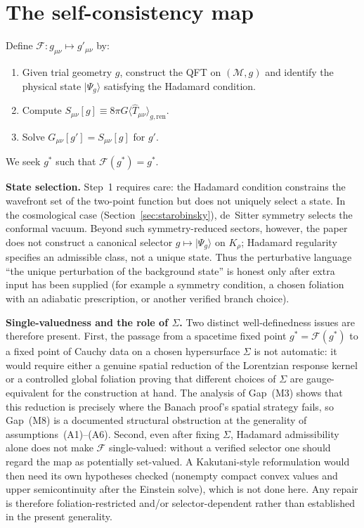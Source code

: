 \documentclass[12pt,a4paper]{article}
\begin{document}
\section{The self-consistency map}
\label{sec:map}

Define $\mathcal{F}: g_{\mu\nu} \mapsto g'_{\mu\nu}$ by:
\begin{enumerate}
\item Given trial geometry $g$, construct the QFT on $(\mathcal{M},g)$ and identify the
physical state $|\Psi_g\rangle$ satisfying the Hadamard condition.
\item Compute $S_{\mu\nu}[g] \equiv 8\pi G\langle\hat{T}_{\mu\nu}\rangle_{g,\text{ren}}$.
\item Solve $G_{\mu\nu}[g'] = S_{\mu\nu}[g]$ for $g'$.
\end{enumerate}
We seek $g^*$ such that $\mathcal{F}(g^*) = g^*$.

\medskip\noindent\textbf{State selection.} Step~1 requires care: the Hadamard condition
constrains the wavefront set of the two-point function but does not uniquely select a
state. In the cosmological case (Section~\ref{sec:starobinsky}), de~Sitter symmetry
selects the conformal vacuum. Beyond such symmetry-reduced sectors, however, the paper
does not construct a canonical selector $g\mapsto |\Psi_g\rangle$ on $K_\rho$; Hadamard
regularity specifies an admissible class, not a unique state. Thus the perturbative
language ``the unique perturbation of the background state'' is honest only after extra
input has been supplied (for example a symmetry condition, a chosen foliation with an
adiabatic prescription, or another verified branch choice).

\medskip\noindent\textbf{Single-valuedness and the role of $\Sigma$.} Two distinct
well-definedness issues are therefore present. First, the passage from a spacetime fixed
point $g^*=\mathcal{F}(g^*)$ to a fixed point of Cauchy data on a chosen hypersurface
$\Sigma$ is not automatic: it would require either a genuine spatial reduction of the
Lorentzian response kernel or a controlled global foliation proving that different choices
of $\Sigma$ are gauge-equivalent for the construction at hand. The analysis of Gap~(M3)
shows that this reduction is precisely where the Banach proof's spatial strategy fails, so
Gap~(M8) is a documented structural obstruction at the generality of
assumptions~(A1)--(A6). Second, even after fixing $\Sigma$, Hadamard admissibility alone
does not make $\mathcal{F}$ single-valued: without a verified selector one should regard
the map as potentially set-valued. A Kakutani-style reformulation would then need its own
hypotheses checked (nonempty compact convex values and upper semicontinuity after the
Einstein solve), which is not done here. Any repair is therefore foliation-restricted
and/or selector-dependent rather than established in the present generality.
\end{document}
